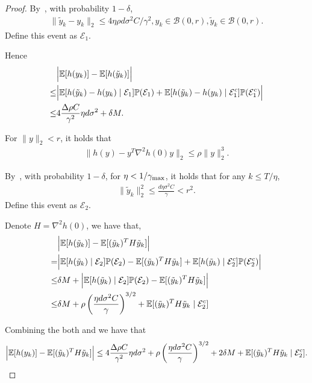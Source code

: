 \begin{proof}
    By~, with probability $1 - \delta$, 
    \begin{align*}
        \| \tilde y_k - y_k \|_2  \le   4{\eta \rho d\sigma^2 C }/{\gamma^2}, y_k\in \mathcal{B}(0,r) , \tilde y_k \in \mathcal{B}(0,r).
    \end{align*}
    Define this event as $\mathcal{E}_1$.



    Hence 
    \begin{align*}
        &\Big| \mathbb{E}[h(y_k)] - \mathbb{E}[ h(\tilde y_k)] \Big|\\
        \le& \Big| \mathbb{E}[h(\tilde y_k) - h(y_k) \mid \mathcal{E}_1 ]\mathbb{P}(\mathcal{E}_1  ) + \mathbb{E}[h(\tilde y_k) - h(y_k) \mid \mathcal{E}_1^c ]\mathbb{P}(\mathcal{E}_1^c) \Big | \\
        \le& 4\frac{ \Delta \rho C}{\gamma^2} \eta  d \sigma^2 + \delta M.
    \end{align*}

    
    For $\| y \|_2 < r$, it holds that
    \begin{align*}
        \| h(y) - y^T \nabla^2 h(0) y \|_2 \le \rho \| y \|_2^3.
    \end{align*}

    By~, with probability $1 - \delta$, for $\eta < 1/\gamma_{\mathrm{max}}$, it holds that for any $k \le T/\eta$, 
    \begin{align*}
   \| \tilde y_k \|_2^2 \le \frac{ d\eta \sigma^2  C}{{\gamma}} < r^2.
    \end{align*}
Define this event as $\mathcal{E}_2$.

    Denote $H = \nabla^2 h(0)$, we have that,
    \begin{align*}
        &\Big| \mathbb{E}[h(\tilde y_k)] - \mathbb{E}[(\tilde y_k)^T H \tilde y_k] \Big|\\
    =&  \Big| \mathbb{E}[h(\tilde y_k) \mid \mathcal{E}_2] \mathbb{P}(\mathcal{E}_2) - \mathbb{E}[(\tilde y_k)^T H \tilde y_k] +   \mathbb{E}[h(\tilde y_k) \mid \mathcal{E}_2^c]\mathbb{P}(\mathcal{E}_2^c)\Big | \\
    \le&  \delta M + \Big|\mathbb{E}[h(\tilde y_k) \mid \mathcal{E}_2] \mathbb{P}(\mathcal{E}_2) -   \mathbb{E}[(\tilde y_k)^T H \tilde y_k] \Big| \\
    \le&  \delta M + \rho  \left( \frac{ \eta d \sigma^2  C}{{\gamma}} \right)^{3/2}+ \mathbb{E}[(\tilde y_k)^T H \tilde y_k \mid \mathcal{E}_2^c]
    \end{align*}

    Combining the both and we have that
    \begin{align*}
          \Big| \mathbb{E}[h(y_k)] - \mathbb{E}[(\tilde y_k)^T H \tilde y_k]  \Big| \le 4\frac{ \Delta \rho C}{\gamma^2} \eta  d \sigma^2 + \rho \left( \frac{ \eta d \sigma^2  C}{{\gamma}} \right)^{3/2} + 2\delta M + \mathbb{E}[(\tilde y_k)^T H \tilde y_k \mid \mathcal{E}_2^c].
    \end{align*}


\end{proof}
